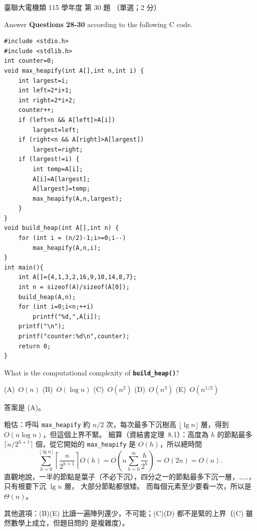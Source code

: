 \begin{pastexam}[label={px:ust-115-ee-ds-30}]{臺聯大電機類 115 學年度 第 30 題}
（單選；2 分）

Answer \textbf{Questions 28-30} according to the following C code.
\begin{verbatim}
#include <stdio.h>
#include <stdlib.h>
int counter=0;
void max_heapify(int A[],int n,int i) {
    int largest=i;
    int left=2*i+1;
    int right=2*i+2;
    counter++;
    if (left<n && A[left]>A[i])
        largest=left;
    if (right<n && A[right]>A[largest])
        largest=right;
    if (largest!=i) {
        int temp=A[i];
        A[i]=A[largest];
        A[largest]=temp;
        max_heapify(A,n,largest);
    }
}
void build_heap(int A[],int n) {
    for (int i = (n/2)-1;i>=0;i--)
        max_heapify(A,n,i);
}
int main(){
    int A[]={4,1,3,2,16,9,10,14,8,7};
    int n = sizeof(A)/sizeof(A[0]);
    build_heap(A,n);
    for (int i=0;i<n;++i)
        printf("%d,",A[i]);
    printf("\n");
    printf("counter:%d\n",counter);
    return 0;
}
\end{verbatim}

What is the computational complexity of \texttt{\textbf{build\_heap()}}?

(A)~$O(n)$ \qquad (B)~$O(\log n)$ \qquad (C)~$O(n^2)$ \qquad (D)~$O(n^3)$ \qquad (E)~$O(n^{1/2})$
\end{pastexam}

\begin{pastsoln}
答案是 (A)。

粗估：呼叫 \texttt{max\_heapify} 約 $n/2$ 次，每次最多下沉樹高 $\lfloor \lg n \rfloor$ 層，得到
$O(n \log n)$，但這個上界不緊。 細算（資結書定理~8.1）：高度為 $h$ 的節點最多
$\lceil n / 2^{h+1} \rceil$ 個，從它開始的 \texttt{max\_heapify} 是 $O(h)$，所以總時間
\[
\sum_{h=0}^{\lfloor \lg n \rfloor} \left\lceil \frac{n}{2^{h+1}} \right\rceil O(h)
= O\!\left(n \sum_{h=0}^{\infty} \frac{h}{2^{h}}\right) = O(2n) = O(n) .
\]
直觀地說，一半的節點是葉子（不必下沉），四分之一的節點最多下沉一層，……，只有根要下沉 $\lg n$ 層，
大部分節點都很矮。 而每個元素至少要看一次，所以是 $\Theta(n)$。

其他選項：(B)(E) 比讀一遍陣列還少，不可能；(C)(D) 都不是緊的上界（(C) 雖然數學上成立，但題目問的
是複雜度）。
\end{pastsoln}
